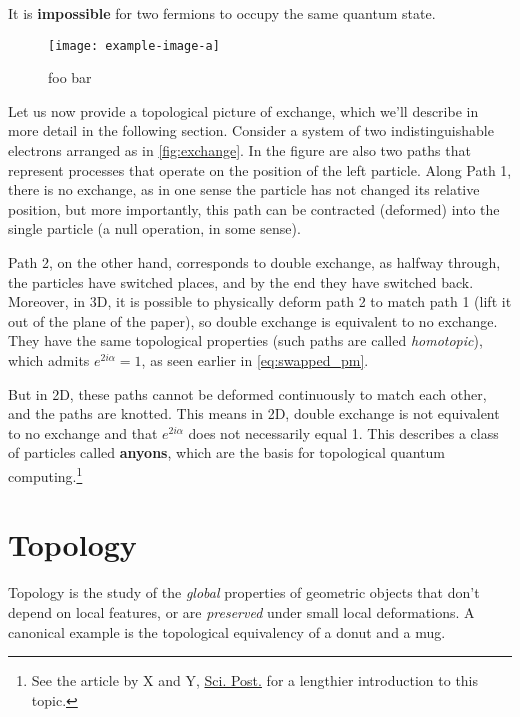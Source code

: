 \begin{tcolorbox}[title = Pauli exclusion principle]
	It is \textbf{impossible} for two fermions to occupy the same quantum state.
\end{tcolorbox}


\begin{figure}
	\centering 
	\texttt{[image: example-image-a]}
	\caption{foo bar}
	\label{fig:exchange}
\end{figure}


Let us now provide a topological picture of exchange, which we'll describe in more detail in the following section.
Consider a system of two indistinguishable electrons arranged as in \autoref{fig:exchange}.
In the figure are also two paths that represent processes that operate on the position of the left particle.
Along Path 1, there is no exchange, as in one sense the particle has not changed its relative position, but more importantly, this path can be contracted (deformed) into the single particle (a null operation, in some sense).


Path 2, on the other hand, corresponds to double exchange, as halfway through, the particles have switched places, and by the end they have switched back.
Moreover, in 3D, it is possible to physically deform path 2 to match path 1 (lift it out of the plane of the paper), so double exchange is equivalent to no exchange.
They have the same topological properties (such paths are called \emph{homotopic}), which admits $e^{2 i \alpha} = 1$, as seen earlier in \autoref{eq:swapped_pm}.


But in 2D, these paths cannot be deformed continuously to match each other, and the paths are knotted.
This means in 2D, double exchange is not equivalent to no exchange and that $e^{2 i \alpha}$ does not necessarily equal 1.
This describes a class of particles called \textbf{anyons}, which are the basis for topological quantum computing.\footnote{See the article by X and Y, \href{https://arxiv.org/abs/1705.04103}{Sci. Post.} for a lengthier introduction to this topic.}



\section{Topology}

Topology is the study of the \emph{global} properties of geometric objects that don't depend on local features, or are \emph{preserved} under small local deformations.
A canonical example is the topological equivalency of a donut and a mug.

